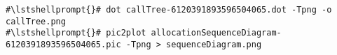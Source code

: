 \begin{lstlisting}[caption=Command to convert the diagrams,label=lst:traceAnalysis:convertDiagrams]
#\lstshellprompt{}# dot callTree-6120391893596504065.dot -Tpng -o callTree.png
#\lstshellprompt{}# pic2plot allocationSequenceDiagram-6120391893596504065.pic -Tpng > sequenceDiagram.png			 
\end{lstlisting}